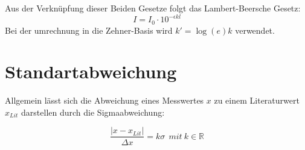 Aus der Verknüpfung dieser Beiden Gesetze folgt das Lambert-Beersche Gesetz:
\begin{equation}
    I = I_0 \cdot 10^{-\epsilon k l}
\end{equation}
Bei der umrechnung in die Zehner-Basis wird $k' = \log(e) k$ verwendet.

\section{Standartabweichung}
Allgemein lässt sich die Abweichung eines Messwertes $x$ zu einem Literaturwert $x_{Lit}$ darstellen durch die Sigmaabweichung:

\begin{equation}
    \frac{|x-x_{Lit}|}{\Delta x} = k \sigma \ \ mit \ k \in \mathbb{R}
    \label{eq:sigma}
\end{equation}